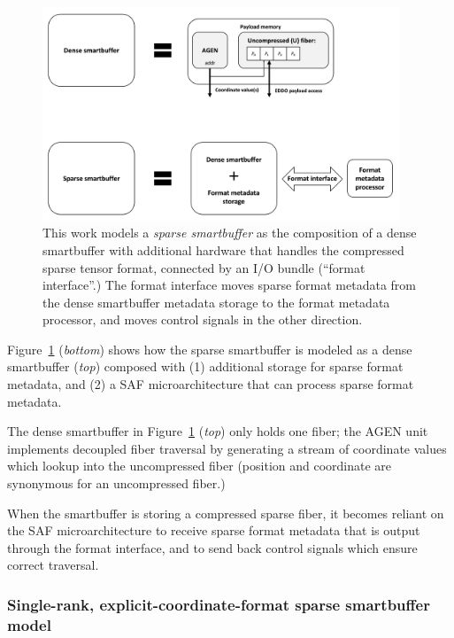 \begin{figure}[ht]
    \centering
    \includegraphics[width=0.95\textwidth]{figures/dense_smartbuffer_composition.png}
    \caption{This work models a \textit{sparse smartbuffer} as the composition of a dense smartbuffer with additional hardware that handles the compressed sparse tensor format, connected by an I/O bundle (``format interface''.) The format interface moves sparse format metadata from the dense smartbuffer metadata storage to the format metadata processor, and moves control signals in the other direction.}
    \label{fig:dense_smartbuffer_composition}
\end{figure}

Figure~\ref{fig:dense_smartbuffer_composition} (\textit{bottom}) shows how the sparse smartbuffer is modeled as a dense smartbuffer (\textit{top}) composed with (1) additional storage for sparse format metadata, and (2) a SAF microarchitecture that can process sparse format metadata. 

The dense smartbuffer in Figure~\ref{fig:dense_smartbuffer_composition} (\textit{top}) only holds one fiber; the AGEN unit implements decoupled fiber traversal by generating a stream of coordinate values which lookup into the uncompressed fiber (position and coordinate are synonymous for an uncompressed fiber.)

When the smartbuffer is storing a compressed sparse fiber, it becomes reliant on the SAF microarchitecture to receive sparse format metadata that is output through the format interface, and to send back control signals which ensure correct traversal.

\subsubsection{Single-rank, explicit-coordinate-format sparse smartbuffer model}
\label{sec:single_explicit_fiber}

